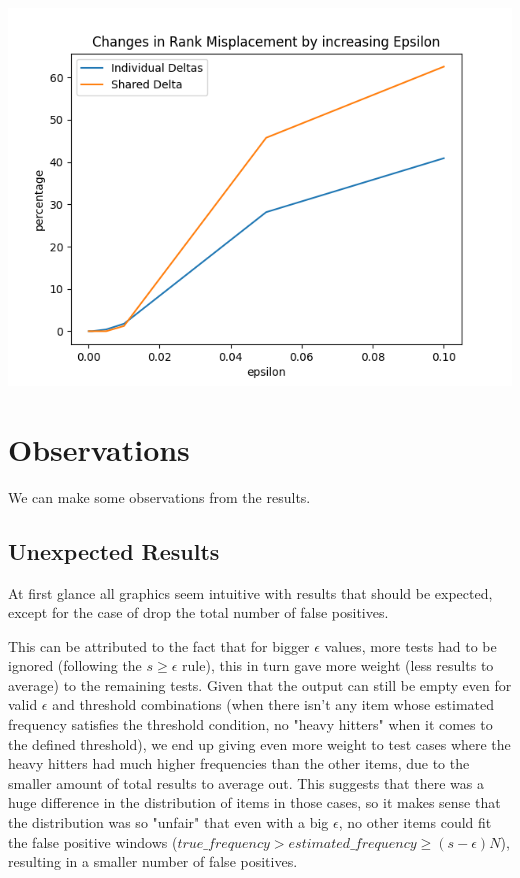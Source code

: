 \documentclass[...]{revdetua}
\begin{document}
\includegraphics[scale=0.5]{rank misplacement.png}

\section{Observations}
We can make some observations from the results.
\subsection{Unexpected Results}
At first glance all graphics seem intuitive with results that should be expected, except for the case of drop the total number of false positives.
\par
This can be attributed to the fact that for bigger $\epsilon$ values, more tests had to be ignored (following the $s \geq \epsilon$ rule), this in turn gave more weight (less results to average) to the remaining tests. Given that the output can still be empty even for valid $\epsilon$ and threshold combinations (when there isn't any item whose estimated frequency satisfies the threshold condition, no "heavy hitters" when it comes to the defined threshold), we end up giving even more weight to test cases where the heavy hitters had much higher frequencies than the other items, due to the smaller amount of total results to average out. This suggests that there was a huge difference in the distribution of items in those cases, so it makes sense that the distribution was so "unfair" that even with a big $\epsilon$, no other items could fit the false positive windows ($true\_frequency > estimated\_frequency \geq (s-\epsilon)N$), resulting in a smaller number of false positives.
\end{document}
